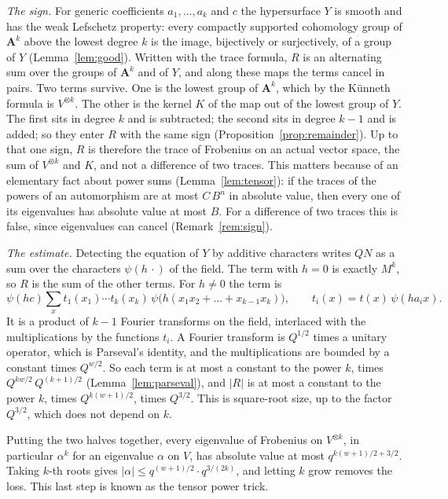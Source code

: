 \documentclass[11pt,a4paper]{article}
\theoremstyle{plain}
\theoremstyle{remark}
\newcommand{\A}{\mathbf A}
\begin{document}
\emph{The sign.} For generic coefficients $a_1,\dots,a_k$ and $c$ the hypersurface $Y$ is smooth and has the weak
Lefschetz property: every compactly supported cohomology group of $\A^k$ above the lowest degree $k$ is the image,
bijectively or surjectively, of a group of $Y$ (Lemma~\ref{lem:good}). Written with the trace formula, $R$ is an
alternating sum over the groups of $\A^k$ and of $Y$, and along these maps the terms cancel in pairs. Two terms
survive. One is the lowest group of $\A^k$, which by the K\"unneth formula is $V^{\otimes k}$. The other is the
kernel $K$ of the map out of the lowest group of $Y$. The first sits in degree $k$ and is subtracted; the second
sits in degree $k-1$ and is added; so they enter $R$ with the same sign (Proposition~\ref{prop:remainder}). Up to
that one sign, $R$ is therefore the trace of Frobenius on an actual vector space, the sum of $V^{\otimes k}$ and
$K$, and not a difference of two traces. This matters because of an elementary fact about power sums
(Lemma~\ref{lem:tensor}): if the traces of the powers of an automorphism are at most $C\,B^n$ in absolute value,
then every one of its eigenvalues has absolute value at most $B$. For a difference of two traces this is false,
since eigenvalues can cancel (Remark~\ref{rem:sign}).

\emph{The estimate.} Detecting the equation of $Y$ by additive characters writes $QN$ as a sum over the characters
$\psi(h\,\cdot)$ of the field. The term with $h=0$ is exactly $M^k$, so $R$ is the sum of the other terms. For
$h\ne0$ the term is
\[
\psi(hc)\sum_{x}t_1(x_1)\cdots t_k(x_k)\,\psi\bigl(h(x_1x_2+\dots+x_{k-1}x_k)\bigr),\qquad
t_i(x)=t(x)\,\psi(ha_ix).
\]
It is a product of $k-1$ Fourier transforms on the field, interlaced with the multiplications by the functions
$t_i$. A Fourier transform is $Q^{1/2}$ times a unitary operator, which is Parseval's identity, and the
multiplications are bounded by a constant times $Q^{w/2}$. So each term is at most a constant to the power $k$,
times $Q^{kw/2}\,Q^{(k+1)/2}$ (Lemma~\ref{lem:parseval}), and $|R|$ is at most a constant to the power $k$, times
$Q^{k(w+1)/2}$, times $Q^{3/2}$. This is square-root size, up to the factor $Q^{3/2}$, which does not depend on $k$.

Putting the two halves together, every eigenvalue of Frobenius on $V^{\otimes k}$, in particular $\alpha^k$ for an
eigenvalue $\alpha$ on $V$, has absolute value at most $q^{k(w+1)/2+3/2}$. Taking $k$-th roots gives
$|\alpha|\le q^{(w+1)/2}\cdot q^{3/(2k)}$, and letting $k$ grow removes the loss. This last step is known as the
tensor power trick.
\end{document}
